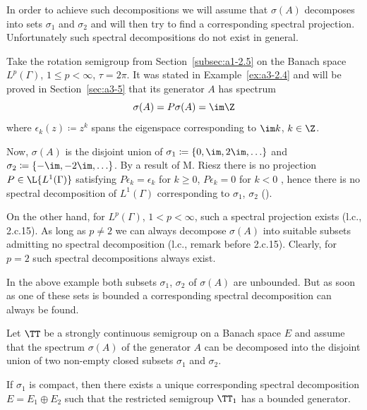 In order to achieve such decompositions we will assume that $\sigma(A)$ decomposes into sets $\sigma_{1}$ and $\sigma_{2}$ and will then try to find a corresponding spectral projection.
Unfortunately such spectral decompositions do not exist in general.
\begin{example}\label{ex:a3-3.2}
Take the rotation semigroup from Section~\ref{subsec:a1-2.5} on the Banach space $L^{p}(\Gamma)$, $1 \leq p < \infty$, $\tau = 2\pi$.
It was stated in Example~\ref{ex:a3-2.4} and will be proved in Section~\ref{sec:a3-5} that its generator $A$ has spectrum
\[
\sigma(A) = P\sigma(A) = \im\Z
\]
where $\epsilon_{k}(z) \coloneqq z^{k}$ spans the eigenspace corresponding to $\im k$, $k \in \Z$.

Now, $\sigma(A)$ is the disjoint union of $\sigma_{1} \coloneqq \{0,\im ,2\im, \ldots\}$ 
and $\sigma_{2} \coloneqq \{-\im, -2\im, \ldots\}$.
By a result of M. Riesz there is no projection $P \in \L{L^{1}(\Gamma)}$ satisfying $P\epsilon_{k} = \epsilon_{k}$ for $k \geq 0$, $P\epsilon_{k} = 0$ for $k < 0$ , hence there is no spectral decomposition of\/ $L^{1}(\Gamma)$ corresponding to $\sigma_{1}$, $\sigma_{2}$ (\textcite[p.165]{lindenstraustzafriri:1979}).

On the other hand, for $L^{p}(\Gamma)$, $1 < p < \infty$, such a spectral projection exists (l.c., 2.c.15).
As long as $p \neq 2$ we can always decompose $\sigma(A)$ into suitable subsets admitting no spectral decomposition (l.c., remark before 2.c.15).
Clearly, for $p = 2$ such spectral decompositions always exist.
\end{example}
In the above example both subsets $\sigma_{1}$, $\sigma_{2}$ of\/ $\sigma(A)$ are unbounded.
But as soon as one of these sets is bounded a corresponding spectral decomposition can always be found.
\begin{theorem}\label{thm:a3-3.3}
Let $\TT$ be a strongly continuous semigroup on a Banach space $E$ and assume that the spectrum $\sigma(A)$ of the generator $A$ can be decomposed into the disjoint union of two non-empty closed subsets $\sigma_{1}$ and 
$\sigma_{2}$.

If\/ $\sigma_{1}$ is compact, then there exists a unique corresponding spectral decomposition $E = E_{1} \oplus E_{2}$ such that the restricted semigroup $\TT_{1}$ has a bounded generator.
\end{theorem}

